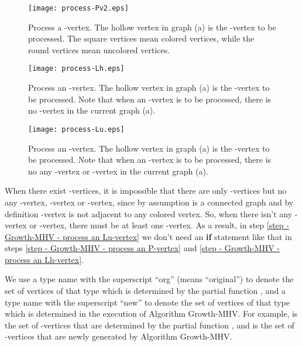 \documentclass[11pt]{article}
\begin{document}
\begin{figure}
\begin{center}
\texttt{[image: process-Pv2.eps]}
\end{center}
\caption{Process a -vertex. The hollow vertex  in graph (a) is
the -vertex to be processed. The square vertices mean colored vertices,
while the round vertices mean uncolored vertices.}
\label{fig - process a P-vertex}
\end{figure}

\begin{figure}
\begin{center}
\texttt{[image: process-Lh.eps]}
\end{center}
\caption{Process an -vertex. The hollow vertex  in graph (a) is
the -vertex to be processed. Note that when an -vertex is
to be processed, there is no -vertex in the current graph (a).}
\label{fig - process a Lh-vertex}
\end{figure}

\begin{figure}
\begin{center}
\texttt{[image: process-Lu.eps]}
\end{center}
\caption{Process an -vertex. The hollow vertex  in graph (a) is
the -vertex to be processed. Note that when an -vertex is
to be processed, there is no any -vertex or -vertex in the current
graph (a).}
\label{fig - process a Lu-vertex}
\end{figure}


When there exist -vertices, it is impossible that there are only
-vertices but no any -vertex, -vertex or -vertex,
since by assumption  is a connected graph and by definition
-vertex is not adjacent to any colored vertex.
So, when there isn't any -vertex or -vertex, there must be
at least one -vertex.
As a result, in step \ref{step - Growth-MHV - process an Lu-vertex}
we don't need an {\bf if} statement like that in
steps \ref{step - Growth-MHV - process an P-vertex} and
\ref{step - Growth-MHV - process an Lh-vertex}.

We use a type name with the superscript ``org'' (means ``original'') to
denote the set of vertices of that type which is determined by
the partial function , and a type name with the superscript ``new'' to
denote the set of vertices of that type which is determined in the execution
of Algorithm {\sc Growth-MHV}. For example,  is the set of -vertices
that are determined by the partial function , and  is the set of
-vertices that are newly generated by Algorithm {\sc Growth-MHV}.
\end{document}
